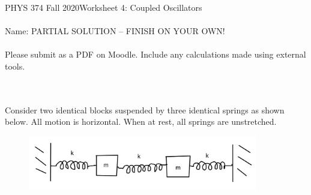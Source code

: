 \documentclass[12pt]{article}
\newcommand{\purple}[1]{{\color{purple} #1}}
\begin{document}
PHYS 374 Fall 2020\hfill Worksheet 4: Coupled Oscillators\\
\\
Name: \purple{PARTIAL SOLUTION -- FINISH ON YOUR OWN!}\\
\\
Please submit as a PDF on Moodle. Include any calculations made using external tools.

\hrulefill
\\
\\
Consider two identical blocks suspended by three identical springs as shown below. All motion is horizontal. When at rest, all springs are unstretched. 
\begin{figure}[h]
\includegraphics[width=10cm]{coupled-oscillators.png}
\centering
\end{figure}
\end{document}
